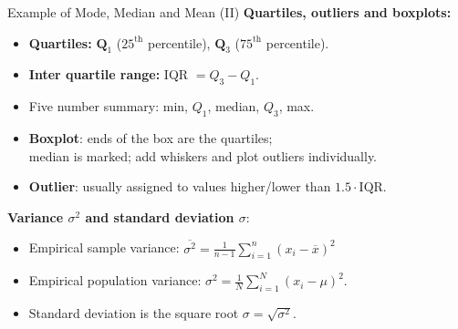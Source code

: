 \begin{frame}{Example of Mode, Median and Mean (II)}
  \textbf{Quartiles, outliers and boxplots:}
  \begin{itemize}
  \item \textbf{Quartiles:} {\color{blue}$\mathbf{Q}_1$} ($25^{\text{th}}$ percentile), {\color{blue}$\mathbf{Q}_3$} ($75^{\text{th}}$ percentile).
  \item \textbf{Inter quartile range:} {\color{blue}IQR} $=Q_3-Q_1$.
  \item Five number summary: min, $Q_1$, median, $Q_3$, max.
  \item \textbf{Boxplot}: ends of the box are the quartiles; \\ median is marked; add whiskers and plot outliers individually.
  \item \textbf{Outlier}: usually assigned to values higher/lower than $1.5 \cdot \text{IQR}$.
  \end{itemize}
  \textbf{Variance $\sigma^2$ and standard deviation $\sigma$}:
  \begin{itemize}
  \item Empirical sample variance: $\overline{\sigma^2} = \frac{1}{n-1} \sum_{i=1}^{n}(x_i-\overline{x})^2$
  \item Empirical population variance: $\sigma^2 = \frac{1}{N} \sum_{i=1}^{N} (x_i - \mu)^2$.
  \item Standard deviation is the square root $\sigma = \sqrt{\sigma^2}$.
  \end{itemize}
\end{frame}

